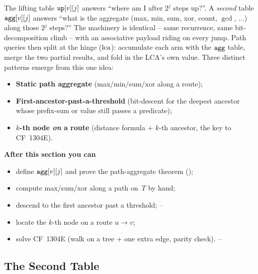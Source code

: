 \begin{topicintro}
The lifting table \(\texttt{up}[v][j]\) answers ``where am I after
\(2^j\) steps up?''.  A \emph{second} table \(\texttt{agg}[v][j]\) answers
``what is the aggregate (max, min, sum, xor, count, \(\gcd\), \(\dots\))
along those \(2^j\) steps?''  The machinery is identical -- same
recurrence, same bit-decomposition climb -- with an associative payload
riding on every jump.  Path queries then split at the hinge (\(\operatorname{lca}\)):
accumulate each arm with the \(\texttt{agg}\) table, merge the two partial
results, and fold in the LCA's own value.  Three distinct patterns emerge
from this one idea:
\begin{itemize}[nosep]
  \item \textbf{Static path aggregate} (max/min/sum/xor along a route);
  \item \textbf{First-ancestor-past-a-threshold} (bit-descent for the
        deepest ancestor whose prefix-sum or value still passes a
        predicate);
  \item \textbf{\(k\)-th node \emph{on} a route} (distance formula
        + \(k\)-th ancestor, the key to CF~1304E).
\end{itemize}

\textbf{After this section you can}
\begin{itemize}[nosep]
  \item define \(\texttt{agg}[v][j]\) and prove the path-aggregate
        theorem (); \hfill{}
  \item compute max/sum/xor along a path on~\(T\) by hand; \hfill{}
  \item descend to the first ancestor past a threshold; \hfill{}--
  \item locate the \(k\)-th node on a route \(u\to v\); \hfill{}
  \item solve CF~1304E (walk on a tree + one extra edge, parity check).
        \hfill{}--
\end{itemize}
\end{topicintro}

\subsection{The Second Table}

